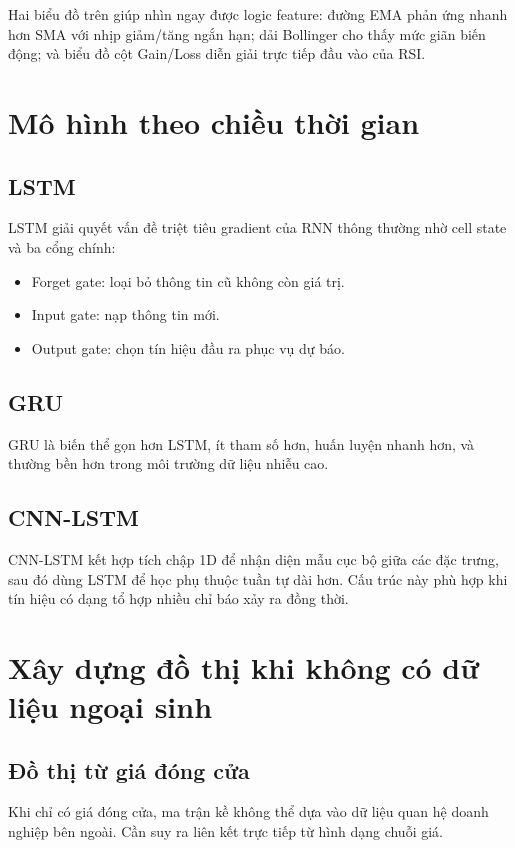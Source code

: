 \documentclass[12pt,a4paper]{article}
\begin{document}
Hai biểu đồ trên giúp nhìn ngay được logic feature: đường EMA phản ứng nhanh hơn SMA với nhịp giảm/tăng ngắn hạn; dải Bollinger cho thấy mức giãn biến động; và biểu đồ cột Gain/Loss diễn giải trực tiếp đầu vào của RSI.

\FloatBarrier

\section{Mô hình theo chiều thời gian}
\subsection{LSTM}
LSTM giải quyết vấn đề triệt tiêu gradient của RNN thông thường nhờ cell state và ba cổng chính:
\begin{itemize}[leftmargin=1.5em]
  \item Forget gate: loại bỏ thông tin cũ không còn giá trị.
  \item Input gate: nạp thông tin mới.
  \item Output gate: chọn tín hiệu đầu ra phục vụ dự báo.
\end{itemize}

\subsection{GRU}
GRU là biến thể gọn hơn LSTM, ít tham số hơn, huấn luyện nhanh hơn, và thường bền hơn trong môi trường dữ liệu nhiễu cao.

\subsection{CNN-LSTM}
CNN-LSTM kết hợp tích chập 1D để nhận diện mẫu cục bộ giữa các đặc trưng, sau đó dùng LSTM để học phụ thuộc tuần tự dài hơn. Cấu trúc này phù hợp khi tín hiệu có dạng tổ hợp nhiều chỉ báo xảy ra đồng thời.

\section{Xây dựng đồ thị khi không có dữ liệu ngoại sinh}
\subsection{Đồ thị từ giá đóng cửa}
Khi chỉ có giá đóng cửa, ma trận kề không thể dựa vào dữ liệu quan hệ doanh nghiệp bên ngoài. Cần suy ra liên kết trực tiếp từ hình dạng chuỗi giá.
\end{document}

